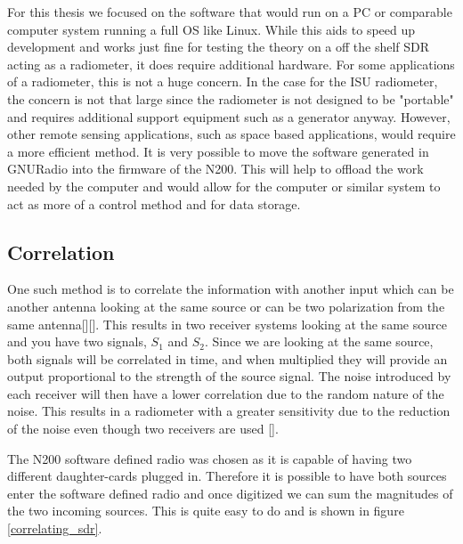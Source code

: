 For this thesis we focused on the software that would run on a PC or comparable computer system running a full OS like Linux.  While this aids to speed up development and works just fine for testing the theory on a off the shelf SDR acting as a radiometer, it does require additional hardware.  For some applications of a radiometer, this is not a huge concern.  In the case for the ISU radiometer, the concern is not that large since the radiometer is not designed to be "portable" and requires additional support equipment such as a generator anyway.  However, other remote sensing applications, such as space based applications, would require a more efficient method.  It is very possible to move the software generated in GNURadio into the firmware of the N200.  This will help to offload the work needed by the computer and would allow for the computer or similar system to act as more of a control method and for data storage.  

\subsection{Correlation}  
One such method is to correlate the information with another input which can be another antenna looking at the same source or can be two polarization from the same antenna[\cite{Clapp}][\cite{Aitkin}].  This results in two receiver systems looking at the same source and you have two signals, $S_1$ and $S_2$.  Since we are looking at the same source, both signals will be correlated in time, and when multiplied they will provide an output proportional to the strength of the source signal.  The noise introduced by each receiver will then have a lower correlation due to the random nature of the noise.  This results in a radiometer with a greater sensitivity due to the reduction of the noise even though two receivers are used [\cite{Fujimoto}].

The N200 software defined radio was chosen as it is capable of having two different daughter-cards plugged in.  Therefore it is possible to have both sources enter the software defined radio and once digitized we can sum the magnitudes of the two incoming sources.  This is quite easy to do and is shown in figure \ref{correlating_sdr}.

